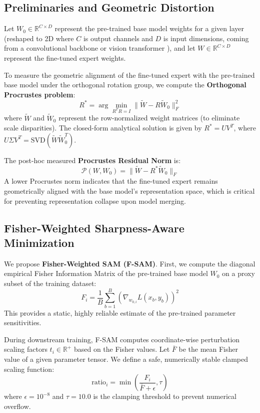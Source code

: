 \documentclass{article}
\theoremstyle{plain}
\theoremstyle{definition}
\theoremstyle{remark}
\begin{document}
\subsection{Preliminaries and Geometric Distortion}
Let $W_0 \in \mathbb{R}^{C \times D}$ represent the pre-trained base model weights for a given layer (reshaped to 2D where $C$ is output channels and $D$ is input dimensions, coming from a convolutional backbone \cite{he16} or vision transformer \cite{dosovitskiy2020image}), and let $W \in \mathbb{R}^{C \times D}$ represent the fine-tuned expert weights.

To measure the geometric alignment of the fine-tuned expert with the pre-trained base model under the orthogonal rotation group, we compute the \textbf{Orthogonal Procrustes problem}:
\begin{equation}
    R^* = \arg\min_{R^T R = I} \|\tilde{W} - R \tilde{W}_0\|_F^2
\end{equation}
where $\tilde{W}$ and $\tilde{W}_0$ represent the row-normalized weight matrices (to eliminate scale disparities). The closed-form analytical solution is given by $R^* = U V^T$, where $U \Sigma V^T = \text{SVD}(\tilde{W} \tilde{W}_0^T)$. 

The post-hoc measured \textbf{Procrustes Residual Norm} is:
\begin{equation}
    \mathcal{P}(W, W_0) = \|\tilde{W} - R^* \tilde{W}_0\|_F
\end{equation}
A lower Procrustes norm indicates that the fine-tuned expert remains geometrically aligned with the base model's representation space, which is critical for preventing representation collapse upon model merging.

\subsection{Fisher-Weighted Sharpness-Aware Minimization}
We propose \textbf{Fisher-Weighted SAM (F-SAM)}. First, we compute the diagonal empirical Fisher Information Matrix of the pre-trained base model $W_0$ on a proxy subset of the training dataset:
\begin{equation}
    F_i = \frac{1}{B} \sum_{b=1}^B \left( \nabla_{w_{0,i}} L(x_b, y_b) \right)^2
\end{equation}
This provides a static, highly reliable estimate of the pre-trained parameter sensitivities.

During downstream training, F-SAM computes coordinate-wise perturbation scaling factors $t_i \in \mathbb{R}^+$ based on the Fisher values. Let $\bar{F}$ be the mean Fisher value of a given parameter tensor. We define a safe, numerically stable clamped scaling function:
\begin{equation}
    \text{ratio}_i = \min\left(\frac{F_i}{\bar{F} + \epsilon}, \tau\right)
\end{equation}
where $\epsilon = 10^{-8}$ and $\tau = 10.0$ is the clamping threshold to prevent numerical overflow.
\end{document}
